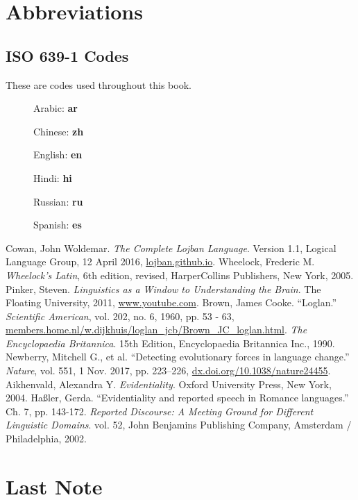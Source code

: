 \documentclass[12pt]{book}
\begin{document}




\chapter{Abbreviations}

\section{ISO 639-1 Codes}

These are codes used throughout this book.

\begin{description}
\item[ ] Arabic: \textbf{ar}
\item[ ] Chinese: \textbf{zh}
\item[ ] English: \textbf{en}
\item[ ] Hindi: \textbf{hi}
\item[ ] Russian: \textbf{ru}
\item[ ] Spanish: \textbf{es}
\end{description}

\begin{thebibliography}{9}
	Cowan, John Woldemar.
	\textit{The Complete Lojban Language}.
	Version 1.1,
	Logical Language Group,
	12 April 2016,
	\href{https://lojban.github.io/cll/}{lojban.github.io}.
	Wheelock, Frederic M.
	\textit{Wheelock's Latin},
	6th edition, revised,
	HarperCollins Publishers, New York,
	2005.
	Pinker, Steven.
	\textit{Linguistics as a Window to Understanding the Brain}.
	The Floating University,
	2011,
	\href{https://www.youtube.com/watch?v=Q-B_ONJIEcE}{www.youtube.com}.
	Brown, James Cooke.
	``Loglan.''
	\textit{Scientific American},
	vol. 202, 
	no. 6, 
	1960,
	pp. 53 - 63,
	\href{http://members.home.nl/w.dijkhuis/loglan\_jcb/Brown\_JC\_loglan.html}{members.home.nl/w.dijkhuis/loglan\_jcb/Brown\_JC\_loglan.html}.
	\textit{The Encyclopaedia Britannica}.
	15th Edition,
	Encyclopaedia Britannica Inc.,
	1990.
	Newberry, Mitchell G., et al. 
	``Detecting evolutionary forces in language change.''
	\textit{Nature},
	vol. 551, 
	1 Nov. 2017,
	pp. 223–226,
	\href{http://dx.doi.org/10.1038/nature24455}{dx.doi.org/10.1038/nature24455}.
	Aikhenvald, Alexandra Y.
	\textit{Evidentiality}.
	Oxford University Press, New York,
	2004.	
	Ha{\ss}ler, Gerda.
	``Evidentiality and reported speech in Romance languages.''
	Ch. 7, 
	pp. 143-172.
	\textit{Reported Discourse: A Meeting Ground for Different Linguistic Domains}.
	vol. 52,
	John Benjamins Publishing Company,
	Amsterdam / Philadelphia,
	2002.
\end{thebibliography}

\backmatter 

\chapter{Last Note}
\end{document}
